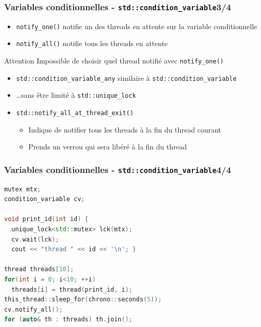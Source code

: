 \documentclass[C++.tex]{subfiles}
\begin{document}
\begin{frame}[fragile]
	\frametitle{Variables conditionnelles - \lstinline|std::condition_variable|\titlehfill{}3/4}
	\begin{itemize}
		\item \lstinline|notify_one()| notifie un des threads en attente sur la variable conditionnelle
		\item \lstinline|notify_all()| notifie tous les threads en attente
	\end{itemize}

	\begin{alertblock}{Attention}
		Impossible de choisir quel thread notifié avec \lstinline|notify_one()|
	\end{alertblock}

	\begin{itemize}
		\item \lstinline|std::condition_variable_any| similaire à \lstinline|std::condition_variable|
		\item \ldots{}sans être limité à \lstinline|std::unique_lock|
		\item \lstinline|std::notify_all_at_thread_exit()| 
		\begin{itemize}
			\item Indique de notifier tous les threads à la fin du thread courant
			\item Prends un verrou qui sera libéré à la fin du thread
		\end{itemize}
	\end{itemize}
\end{frame}

\begin{frame}[fragile]
	\frametitle{Variables conditionnelles - \lstinline|std::condition_variable|\titlehfill{}4/4}
	\begin{lstlisting}[language=C++]
mutex mtx;
condition_variable cv;

void print_id(int id) {
  unique_lock<std::mutex> lck(mtx);
  cv.wait(lck);
  cout << "thread " << id << '\n'; }

thread threads[10];
for(int i = 0; i<10; ++i)
  threads[i] = thread(print_id, i);
this_thread::sleep_for(chrono::seconds(5));
cv.notify_all();
for (auto& th : threads) th.join();\end{lstlisting}
\end{frame}
\end{document}
